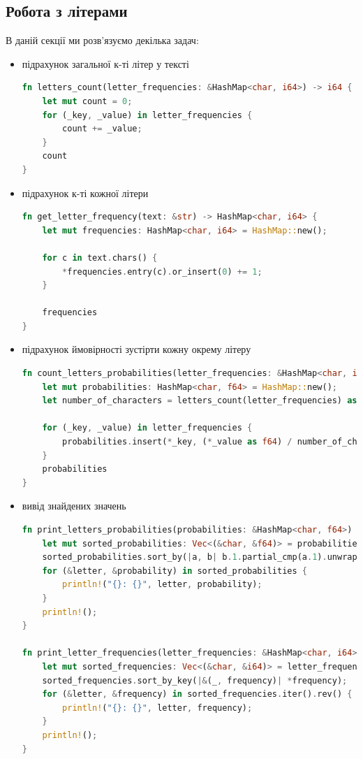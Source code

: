 \documentclass[12pt]{article}
\begin{document}
\subsection{Робота з літерами}
\quad В даній секції ми розв'язуємо декілька задач:
\begin{itemize}
    \item підрахунок загальної к-ті літер у тексті
\begin{lstlisting}[language=Rust]
fn letters_count(letter_frequencies: &HashMap<char, i64>) -> i64 {
    let mut count = 0;
    for (_key, _value) in letter_frequencies {
        count += _value;
    }
    count
}
\end{lstlisting}

    \item підрахунок к-ті кожної літери
\begin{lstlisting}[language=Rust]
fn get_letter_frequency(text: &str) -> HashMap<char, i64> {
    let mut frequencies: HashMap<char, i64> = HashMap::new();

    for c in text.chars() {
        *frequencies.entry(c).or_insert(0) += 1;
    }

    frequencies
}
\end{lstlisting}
    \item підрахунок ймовірності зустірти кожну окрему літеру
\begin{lstlisting}[language=Rust]
fn count_letters_probabilities(letter_frequencies: &HashMap<char, i64>) -> HashMap<char, f64> {
    let mut probabilities: HashMap<char, f64> = HashMap::new();
    let number_of_characters = letters_count(letter_frequencies) as f64;

    for (_key, _value) in letter_frequencies {
        probabilities.insert(*_key, (*_value as f64) / number_of_characters);
    }
    probabilities
}
\end{lstlisting}

    \item вивід знайдених значень
\begin{lstlisting}[language=Rust]
fn print_letters_probabilities(probabilities: &HashMap<char, f64>) {
    let mut sorted_probabilities: Vec<(&char, &f64)> = probabilities.iter().collect();
    sorted_probabilities.sort_by(|a, b| b.1.partial_cmp(a.1).unwrap());
    for (&letter, &probability) in sorted_probabilities {
        println!("{}: {}", letter, probability);
    }
    println!();
}

fn print_letter_frequencies(letter_frequencies: &HashMap<char, i64>) {
    let mut sorted_frequencies: Vec<(&char, &i64)> = letter_frequencies.iter().collect();
    sorted_frequencies.sort_by_key(|&(_, frequency)| *frequency);
    for (&letter, &frequency) in sorted_frequencies.iter().rev() {
        println!("{}: {}", letter, frequency);
    }
    println!();
}
\end{lstlisting}
\end{itemize}
\end{document}

